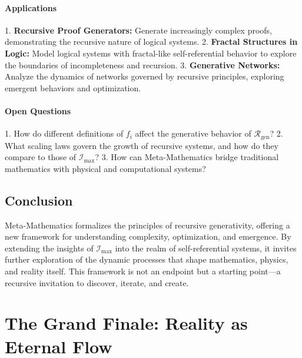 \documentclass[12pt]{article}
\begin{document}
\paragraph{Applications}
1. \textbf{Recursive Proof Generators:} Generate increasingly complex proofs, demonstrating the recursive nature of logical systems.
2. \textbf{Fractal Structures in Logic:} Model logical systems with fractal-like self-referential behavior to explore the boundaries of incompleteness and recursion.
3. \textbf{Generative Networks:} Analyze the dynamics of networks governed by recursive principles, exploring emergent behaviors and optimization.

\paragraph{Open Questions}
1. How do different definitions of \(f_i\) affect the generative behavior of \(\mathcal{R}_{\text{gen}}\)?
2. What scaling laws govern the growth of recursive systems, and how do they compare to those of \( \mathcal{I}_{\text{max}} \)?
3. How can Meta-Mathematics bridge traditional mathematics with physical and computational systems?


\subsection{Conclusion}

Meta-Mathematics formalizes the principles of recursive generativity, offering a new framework for understanding complexity, optimization, and emergence. By extending the insights of \(\mathcal{I}_{\text{max}}\) into the realm of self-referential systems, it invites further exploration of the dynamic processes that shape mathematics, physics, and reality itself. This framework is not an endpoint but a starting point—a recursive invitation to discover, iterate, and create.


\section{The Grand Finale: Reality as Eternal Flow}
\end{document}
